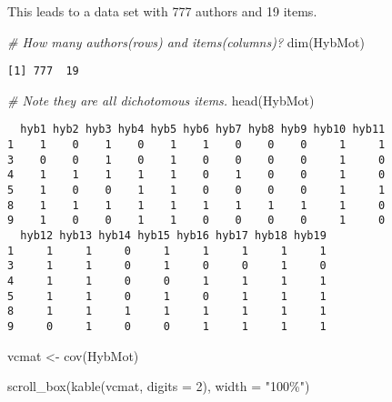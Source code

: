 \documentclass[
]{book}
\newenvironment{Shaded}{\begin{snugshade}}{\end{snugshade}}
\newcommand{\AttributeTok}[1]{\textcolor[rgb]{0.77,0.63,0.00}{#1}}
\newcommand{\CommentTok}[1]{\textcolor[rgb]{0.56,0.35,0.01}{\textit{#1}}}
\newcommand{\DecValTok}[1]{\textcolor[rgb]{0.00,0.00,0.81}{#1}}
\newcommand{\FunctionTok}[1]{\textcolor[rgb]{0.00,0.00,0.00}{#1}}
\newcommand{\NormalTok}[1]{#1}
\newcommand{\OtherTok}[1]{\textcolor[rgb]{0.56,0.35,0.01}{#1}}
\newcommand{\StringTok}[1]{\textcolor[rgb]{0.31,0.60,0.02}{#1}}
\begin{document}
This leads to a data set with 777 authors and 19 items.

\begin{Shaded}
\begin{Highlighting}[]
\CommentTok{\# How many authors(rows) and items(columns)?}
\FunctionTok{dim}\NormalTok{(HybMot)}
\end{Highlighting}
\end{Shaded}

\begin{verbatim}
[1] 777  19
\end{verbatim}

\begin{Shaded}
\begin{Highlighting}[]
\CommentTok{\# Note they are all dichotomous items.}
\FunctionTok{head}\NormalTok{(HybMot)}
\end{Highlighting}
\end{Shaded}

\begin{verbatim}
  hyb1 hyb2 hyb3 hyb4 hyb5 hyb6 hyb7 hyb8 hyb9 hyb10 hyb11
1    1    0    1    0    1    1    0    0    0     1     1
3    0    0    1    0    1    0    0    0    0     1     0
4    1    1    1    1    1    0    1    0    0     1     0
5    1    0    0    1    1    0    0    0    0     1     1
8    1    1    1    1    1    1    1    1    1     1     0
9    1    0    0    1    1    0    0    0    0     1     0
  hyb12 hyb13 hyb14 hyb15 hyb16 hyb17 hyb18 hyb19
1     1     1     0     1     1     1     1     1
3     1     1     0     1     0     0     1     0
4     1     1     0     0     1     1     1     1
5     1     1     0     1     0     1     1     1
8     1     1     1     1     1     1     1     1
9     0     1     0     0     1     1     1     1
\end{verbatim}

\begin{Shaded}
\begin{Highlighting}[]
\NormalTok{vcmat }\OtherTok{\textless{}{-}} \FunctionTok{cov}\NormalTok{(HybMot)}

\FunctionTok{scroll\_box}\NormalTok{(}\FunctionTok{kable}\NormalTok{(vcmat, }\AttributeTok{digits =} \DecValTok{2}\NormalTok{), }\AttributeTok{width =} \StringTok{"100\%"}\NormalTok{)}
\end{Highlighting}
\end{Shaded}
\end{document}
